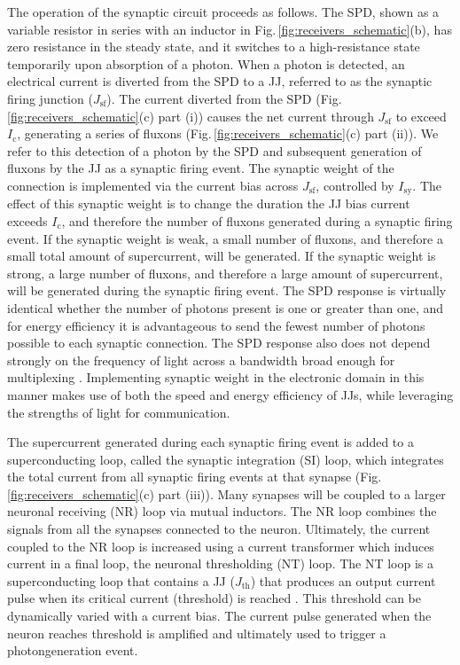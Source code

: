 \documentclass[aip,amsmath,amssymb,reprint,nofootinbib]{revtex4-1}
\begin{document}
The operation of the synaptic circuit proceeds as follows. The SPD, shown as a variable resistor in series with an inductor in Fig.\,\ref{fig:receivers_schematic}(b), has zero resistance in the steady state, and it switches to a high-resistance state temporarily upon absorption of a photon. When a photon is detected, an electrical current is diverted from the SPD to a JJ, referred to as the synaptic firing junction ($J_{\mathrm{sf}}$). The current diverted from the SPD (Fig.\,\ref{fig:receivers_schematic}(c) part (i)) causes the net current through $J_{\mathrm{sf}}$ to exceed $I_{\mathrm{c}}$, generating a series of fluxons (Fig.\,\ref{fig:receivers_schematic}(c) part (ii)). We refer to this detection of a photon by the SPD and subsequent generation of fluxons by the JJ as a synaptic firing event. The synaptic weight of the connection is implemented via the current bias across $J_{\mathrm{sf}}$, controlled by $I_{\mathrm{sy}}$. The effect of this synaptic weight is to change the duration the JJ bias current exceeds $I_{\mathrm{c}}$, and therefore the number of fluxons generated during a synaptic firing event. If the synaptic weight is weak, a small number of fluxons, and therefore a small total amount of supercurrent, will be generated. If the synaptic weight is strong, a large number of fluxons, and therefore a large amount of supercurrent, will be generated during the synaptic firing event. The SPD response is virtually identical whether the number of photons present is one or greater than one, and for energy efficiency it is advantageous to send the fewest number of photons possible to each synaptic connection. The SPD response also does not depend strongly on the frequency of light across a bandwidth broad enough for multiplexing \cite{mave2013}. Implementing synaptic weight in the electronic domain in this manner makes use of both the speed and energy efficiency of JJs, while leveraging the strengths of light for communication.  

The supercurrent generated during each synaptic firing event is added to a superconducting loop, called the synaptic integration (SI) loop, which integrates the total current from all synaptic firing events at that synapse (Fig.\,\ref{fig:receivers_schematic}(c) part (iii)). Many synapses will be coupled to a larger neuronal receiving (NR) loop via mutual inductors. The NR loop combines the signals from all the synapses connected to the neuron. Ultimately, the current coupled to the NR loop is increased using a current transformer which induces current in a final loop, the neuronal thresholding (NT) loop. The NT loop is a superconducting loop that contains a JJ ($J_{\mathrm{th}}$) that produces an output current pulse when its critical current (threshold) is reached \cite{crsc2010}. This threshold can be dynamically varied with a current bias. The current pulse generated when the neuron reaches threshold is amplified and ultimately used to trigger a photon\textendash generation event.
\end{document}
